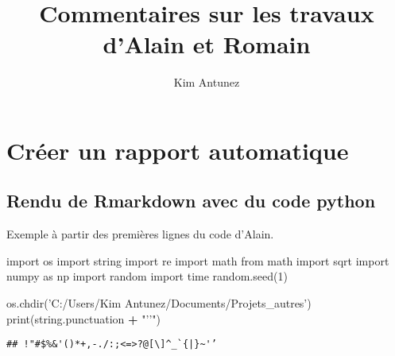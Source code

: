 \documentclass[11pt,french,french]{article}
\title{Commentaires sur les travaux d'Alain et Romain}
\author{Kim Antunez}
\date{}
\newenvironment{Shaded}{\begin{snugshade}}{\end{snugshade}}
\newcommand{\BuiltInTok}[1]{#1}
\newcommand{\DecValTok}[1]{\textcolor[rgb]{0.00,0.00,0.81}{#1}}
\newcommand{\ImportTok}[1]{#1}
\newcommand{\NormalTok}[1]{#1}
\newcommand{\OperatorTok}[1]{\textcolor[rgb]{0.81,0.36,0.00}{\textbf{#1}}}
\newcommand{\StringTok}[1]{\textcolor[rgb]{0.31,0.60,0.02}{#1}}
\begin{document}
\maketitle


{
\hypersetup{linkcolor=black}
\setcounter{tocdepth}{2}
\tableofcontents
}
\hypertarget{cruxe9er-un-rapport-automatique}{%
\section{Créer un rapport
automatique}\label{cruxe9er-un-rapport-automatique}}

\hypertarget{rendu-de-rmarkdown-avec-du-code-python}{%
\subsection{Rendu de Rmarkdown avec du code
python}\label{rendu-de-rmarkdown-avec-du-code-python}}

Exemple à partir des premières lignes du code d'Alain.

\begin{Shaded}
\begin{Highlighting}[]
\ImportTok{import}\NormalTok{ os}
\ImportTok{import}\NormalTok{ string}
\ImportTok{import}\NormalTok{ re}
\ImportTok{import}\NormalTok{ math}
\ImportTok{from}\NormalTok{ math }\ImportTok{import}\NormalTok{ sqrt}
\ImportTok{import}\NormalTok{ numpy }\ImportTok{as}\NormalTok{ np}
\ImportTok{import}\NormalTok{ random}
\ImportTok{import}\NormalTok{ time}
\NormalTok{random.seed(}\DecValTok{1}\NormalTok{)}


\NormalTok{os.chdir(}\StringTok{'C:/Users/Kim Antunez/Documents/Projets_autres'}\NormalTok{)}
\BuiltInTok{print}\NormalTok{(string.punctuation }\OperatorTok{+} \StringTok{"'’"}\NormalTok{)}
\end{Highlighting}
\end{Shaded}

\begin{verbatim}
## !"#$%&'()*+,-./:;<=>?@[\]^_`{|}~'’
\end{verbatim}
\end{document}
